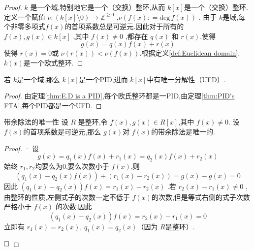 \documentclass[lang=cn,12pt,color=green,fontset=none,pad]{elegantbook}
\begin{document}
\begin{proof}
     $ k $ 是一个域,特别地它是一个（交换）整环,从而 $ k[x] $是一个（交换）整环.定义一个赋值 $ \nu: \left( k[x] \setminus 0\right)\to  \mathbb{Z} ^{\ge 0}  $  ,$ \nu\left( f\left( x \right): = \mathrm{deg}\,f\left( x \right)   \right)  $ .
     由于 $ k $是域,每个非零多项式$ f\left( x \right)  $的首项系数总是可逆元.因此对于所有的 $ f\left( x \right)  , g \left( x \right) \in  k[x]  $ ,其中 $ f\left( x \right)\neq  0  $ ,都存在 $ q\left( x \right)  $ 和 $ r\left( x \right)  $,使得 $$
     g\left( x \right)= q\left( x \right)f\left( x \right)+ r\left( x \right)    
     $$使得 $ r\left( x \right)=0     $或 $ \nu\left( r\left( x \right)  \right)< \nu\left( f\left( x \right)  \right)   $.根据定义\ref{def:Euclidean domain},$ k\left( x \right)   $是一个欧式整环.    
\end{proof}

\begin{corollary}
    若 $ k $是一个域.那么 $ k[x] $是一个PID,进而 $ k[x] $中有唯一分解性（UFD）.   
\end{corollary}

\begin{proof}
    由定理\ref{thm:E.D is a PID},每个欧氏整环都是一PID,由定理\ref{thm:PID's FTA},每个PID都是一个UFD.
\end{proof}

\begin{proposition}{带余除法的唯一性}\label{pro:division uniqueness}
    设 $ R $ 是整环,令 $ f\left( x \right) ,g\left( x  \right)  \in R[x] $,其中 $ f\left( x \right) \neq  0 $.
    设 $ f\left( x \right)  $的首项系数是可逆元,那么 $ g\left( x \right)  $对 $ f\left( x \right)  $的带余除法是唯一的.     
\end{proposition}

\begin{proof}·
    设 $$
    g\left( x \right) = q_1\left( x \right)f\left( x \right)+ r_1\left( x \right)= q_2\left( x \right)f\left( x \right)+ r_2\left( x \right)       
    $$始终 $ r_1,r_2 $均要么为0,要么次数小于 $ f\left( x \right)  $,则 $$
    \left( q_1\left( x \right)-q_2\left( x \right) f\left( x \right)   \right)+ \left( r_1\left( x \right)-r_2\left( x \right)   \right) = g\left( x \right)-g\left( x \right)    =0
    $$  因此 $ \left( q_1\left( x \right)-q_2\left( x \right)   \right)f\left( x \right)=r_1\left( x \right)-r_2\left( x \right)     $ .若 $ r_2\left( x \right)-r_1\left( x \right)\neq 0   $ ,由整环的性质,左侧式子的次数一定不低于 $ f\left( x \right)  $的次数,但是等式右侧的式子次数严格小于 $ f\left( x \right)  $ 的次数.因此 $$
    \left( q_1\left( x \right)-q_2\left( x \right)   \right)f\left( x \right)=r_2\left( x \right)-r_1\left( x \right)=0    
    $$立即有 $ r_1\left( x \right)=r_2\left( x \right)   $, $ q_1\left( x \right)= q_2\left( x \right)   $（因为 $ R $是整环）.   

    $\hfill\square$
\end{proof}
\end{document}
